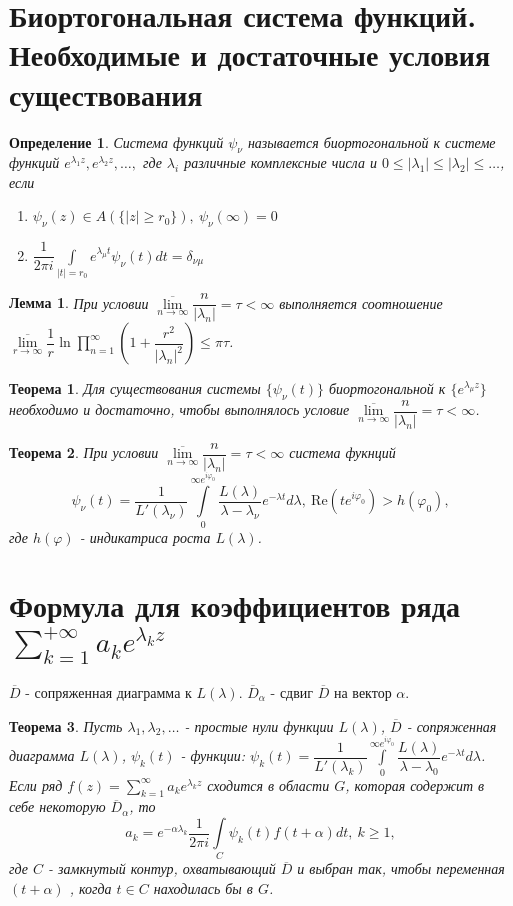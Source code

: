 \documentclass[9pt]{article}
\newtheorem{theorem}{Теорема} %
\newtheorem{lemma}{Лемма} %
\newtheorem{definition}{Определение}
\begin{document}
			\section{Биортогональная система функций. Необходимые и достаточные условия существования}
			\begin{definition}
				Система функций $\psi_\nu$ называется биортогональной к системе функций $e^{\lambda_1 z}, e^{\lambda_2 z}, \dots, $ где $\lambda_i$ различные комплексные числа и $0 \leq |\lambda_1| \leq |\lambda_2| \leq \dots$, если
				\begin{enumerate}
					\item $\psi_\nu (z) \in A(\{|z| \geq r_0\}), \ \psi_\nu (\infty) = 0$
					\item $\dfrac{1}{2\pi i} \int\limits_{|t| = r_0} e^{\lambda_\mu t}\psi_\nu(t) dt = \delta_{\nu\mu}$
				\end{enumerate}		
			\end{definition}
			\begin{lemma}
				При условии $\overline{\lim\limits_{n\to\infty}} \dfrac{n}{|\lambda_n|} = \tau < \infty$ выполняется соотношение $\overline{\lim\limits_{r \to\infty}} \dfrac{1}{r} \ln{\prod_{n=1}^{\infty}\left(1 + \dfrac{r^2}{|\lambda_n|^2}\right) }\leq \pi \tau$.
			\end{lemma}
			\begin{theorem}
				Для существования системы $\{\psi_\nu(t)\}$ биортогональной к $\{e^{\lambda_\mu z}\}$ необходимо и достаточно, чтобы выполнялось условие $\overline{\lim\limits_{n\to\infty}} \dfrac{n}{|\lambda_n|} = \tau < \infty$.
			\end{theorem}
			\begin{theorem}
				При условии $\overline{\lim\limits_{n\to\infty}} \dfrac{n}{|\lambda_n|} = \tau < \infty$ система фукнций
				$$
					\psi_\nu(t) = \dfrac{1}{L'(\lambda_\nu)}\int\limits_0^{\infty e^{i\varphi_0}} \dfrac{L(\lambda)}{\lambda - \lambda_\nu}e^{-\lambda t} d\lambda, \ \mathrm{Re}(te^{i\varphi_0}) > h(\varphi_0),
				$$
				где $h(\varphi)$ - индикатриса роста $L(\lambda)$.
			\end{theorem}
			\section{Формула для коэффициентов ряда $\sum\limits_{k=1}^{+\infty} a_k e^{\lambda_k z}$}
			$\overline{D}$ - сопряженная диаграмма к $L(\lambda)$. $\overline{D}_\alpha$ - сдвиг $\overline{D}$ на вектор $\alpha$.
			\begin{theorem}
				Пусть $\lambda_1, \lambda_2, \dots $ - простые нули функции $L(\lambda)$, 	$\overline{D}$ - сопряженная диаграмма $L(\lambda)$, $\psi_k(t)$ - функции: $\psi_k(t) = \dfrac{1}{L'(\lambda_k)}\int\limits_0^{\infty e^{i\varphi_0}} \dfrac{L(\lambda)}{\lambda - \lambda_0} e^{-\lambda t} d\lambda$. Если ряд $f(z) = \sum\limits_{k=1}^{\infty} a_k e^{\lambda_k z}$ сходится в области $G$, которая содержит в себе некоторую  $\overline{D}_\alpha$, то
				$$
				a_k = e^{-\alpha \lambda_k} \dfrac{1}{2\pi i} \int\limits_{C} \psi_k(t) f(t + \alpha) dt, \ k \geq 1,
				$$
				где $C$ - замкнутый контур, охватывающий $\overline{D}$  и выбран так, чтобы переменная $(t + \alpha)$ , когда $t \in C$ находилась бы в $G$.
			\end{theorem}
\end{document}
